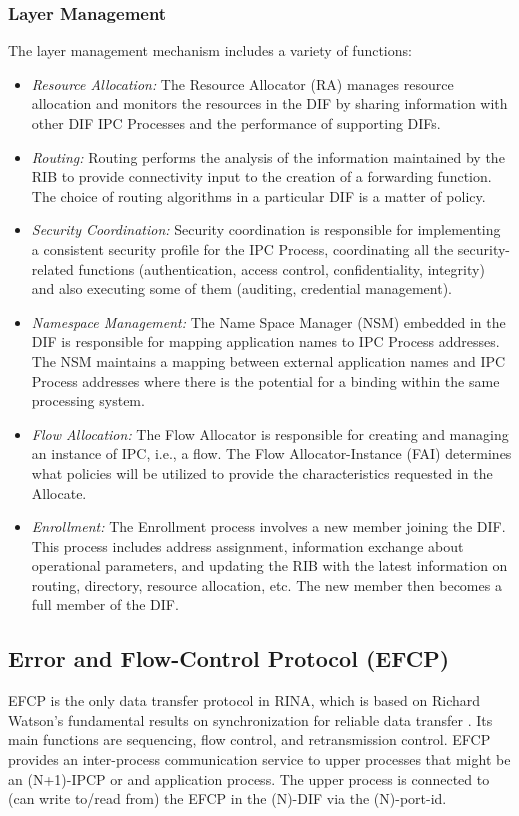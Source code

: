 \documentclass{ieeeaccess}
\begin{document}
\subsubsection{Layer Management}
The layer management mechanism includes a variety of functions:


\begin{itemize}
	\item \textit{Resource Allocation:} The Resource Allocator (RA) manages resource allocation and monitors the resources in the DIF by sharing information with other DIF IPC Processes and the performance of supporting DIFs.
	\item \textit{Routing:} Routing performs the analysis of the information maintained by the RIB to provide connectivity input to the creation of a forwarding function. The choice of routing algorithms in a particular DIF is a matter of policy.
	\item \textit{Security Coordination:} Security coordination is responsible for implementing a consistent security profile for the IPC Process, coordinating all the security-related functions (authentication, access control, confidentiality, integrity) and also executing some of them (auditing, credential management).
	\item \textit{Namespace Management:} The Name Space Manager (NSM) embedded in the DIF is responsible for mapping application names to IPC Process addresses. The NSM maintains a mapping between external application names and IPC Process addresses where there is the potential for a binding within the same processing system.
	\item \textit{Flow Allocation:} The Flow Allocator is responsible for creating and managing an instance of IPC, i.e., a flow. The Flow Allocator-Instance (FAI) determines what policies will be utilized to provide the characteristics requested in the Allocate.
	\item \textit{Enrollment:} The Enrollment process involves a new member joining the DIF. This process includes address assignment, information exchange about operational parameters, and updating the RIB with the latest information on routing, directory, resource allocation, etc. The new member then becomes a full member of the DIF.
\end{itemize}



\subsection{Error and Flow-Control Protocol (EFCP)}
EFCP is the only data transfer protocol in RINA, which is based on Richard Watson's fundamental results on synchronization for reliable data transfer \cite{watson1981timer}. Its main functions are sequencing, flow control, and retransmission control. EFCP provides an inter-process communication service to upper processes that might be an (N+1)-IPCP or and application process. The upper process is connected to (can write to/read from) the EFCP in the (N)-DIF via the (N)-port-id.
\end{document}
